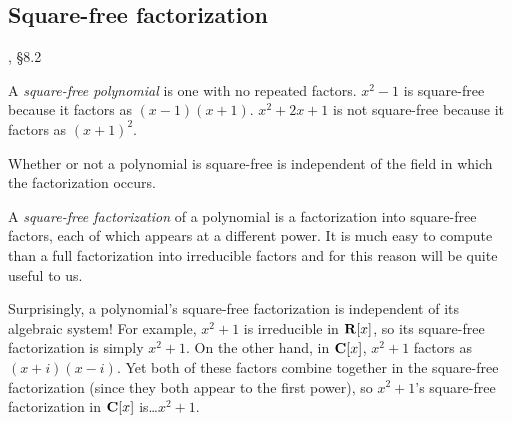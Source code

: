 \begin{comment}
NEED SYMMETRIC POLYNOMIALS AND THEOREM OF PRIMITIVE ELEMENT

\endtheorem

There is only one way to extend an ordered integral domain into an
ordered quotient field.

Next, we introduce real numbers individually as Cauchy sequences and
collectively as an extension field, ordered by showing that the
trailing terms in such a sequence must either converge to zero or
become uniformly positive or negative, establishing O1.  A little more
work is then needed to show that O2 and O3 hold, and that the
Archemedian property carries through.

Next, we show that square roots always exist, as Cauchy sequences, for
all positive numbers.  This requires constructing a sequence of larger
and larger numbers, each of which we square, invert, multiply by 2,
and use A1 to demand an even larger element of {\bf Q}.  Fill in the
details.  Might need Archmedian property for this.

Next, construct ${\bf C}$ by extending algebraically to adjoin $i$,
and use the prior result to demonstrate that square roots exist for
all numbers in ${\bf C}$.  Then introduce the modulus of a complex
number and establish that $|1+\gamma|\le 1+|\gamma|$.

\end{comment}

\subsection*{\qquad Square-free factorization}

\hbox{}\qquad [Ge92], \S 8.2

A {\it square-free polynomial} is one with no repeated factors.
$x^2-1$ is square-free because it factors as $(x-1)(x+1)$.  $x^2+2x+1$
is not square-free because it factors as $(x+1)^2$.

Whether or not a polynomial is square-free is independent of the field
in which the factorization occurs.

A {\it square-free factorization} of a polynomial is a factorization
into square-free factors, each of which appears at a different power.
It is much easy to compute than a full factorization into irreducible
factors and for this reason will be quite useful to us.

Surprisingly, a polynomial's square-free factorization is independent
of its algebraic system!  For example, $x^2+1$ is irreducible in ${\bf
R}[x]$, so its square-free factorization is simply $x^2+1$.  On the
other hand, in ${\bf C}[x]$, $x^2+1$ factors as $(x+i)(x-i)$.  Yet
both of these factors combine together in the square-free
factorization (since they both appear to the first power), so
$x^2+1$'s square-free factorization in ${\bf C}[x]$ is\ldots $x^2+1$.

